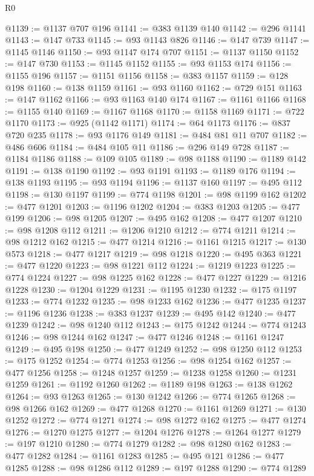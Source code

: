 \begin{lexlean}{R0}
\begin{coremodule}
@1139 := @1137 @707 @196
@1141 := @383 @1139 @140
@1142 := @296 @1141
@1143 := @147 @733
@1145 := @93 @1143 @826
@1146 := @147 @739
@1147 := @1145 @1146
@1150 := @93 @1147 @174 @707
@1151 := @1137 @1150
@1152 := @147 @730
@1153 := @1145 @1152
@1155 := @93 @1153 @174
@1156 := @1155 @196
@1157 := @1151 @1156
@1158 := @383 @1157
@1159 := @128 @198
@1160 := @138 @1159
@1161 := @93 @1160
@1162 := @729 @151
@1163 := @147 @1162
@1166 := @93 @1163 @140 @174
@1167 := @1161 @1166
@1168 := @1155 @140
@1169 := @1167 @1168
@1170 := @1158 @1169
@1171 := @722 @1170
@1173 := @925 (@1142 @1171)
@1174 := @64 @1173
@1176 := @837 @720 @235
@1178 := @93 @1176 @149
@1181 := @484 @81 @11 @707
@1182 := @486 @606
@1184 := @484 @105 @11
@1186 := @296 @149 @728
@1187 := @1184 @1186
@1188 := @109 @105
@1189 := @98 @1188
@1190 := @1189 @142
@1191 := @138 @1190
@1192 := @93 @1191
@1193 := @1189 @176
@1194 := @138 @1193
@1195 := @93 @1194
@1196 := @1137 @160
@1197 := @495 @112
@1198 := @130 @1197
@1199 := @774 @1198
@1201 := @98 @1199 @162
@1202 := @477 @1201
@1203 := @1196 @1202
@1204 := @383 @1203
@1205 := @477 @199
@1206 := @98 @1205
@1207 := @495 @162
@1208 := @477 @1207
@1210 := @98 @1208 @112
@1211 := @1206 @1210
@1212 := @774 @1211
@1214 := @98 @1212 @162
@1215 := @477 @1214
@1216 := @1161 @1215
@1217 := @130 @573
@1218 := @477 @1217
@1219 := @98 @1218
@1220 := @495 @363
@1221 := @477 @1220
@1223 := @98 @1221 @112
@1224 := @1219 @1223
@1225 := @774 @1224
@1227 := @98 @1225 @162
@1228 := @477 @1227
@1229 := @1216 @1228
@1230 := @1204 @1229
@1231 := @1195 @1230
@1232 := @175 @1197
@1233 := @774 @1232
@1235 := @98 @1233 @162
@1236 := @477 @1235
@1237 := @1196 @1236
@1238 := @383 @1237
@1239 := @495 @142
@1240 := @477 @1239
@1242 := @98 @1240 @112
@1243 := @175 @1242
@1244 := @774 @1243
@1246 := @98 @1244 @162
@1247 := @477 @1246
@1248 := @1161 @1247
@1249 := @495 @198
@1250 := @477 @1249
@1252 := @98 @1250 @112
@1253 := @175 @1252
@1254 := @774 @1253
@1256 := @98 @1254 @162
@1257 := @477 @1256
@1258 := @1248 @1257
@1259 := @1238 @1258
@1260 := @1231 @1259
@1261 := @1192 @1260
@1262 := @1189 @198
@1263 := @138 @1262
@1264 := @93 @1263
@1265 := @130 @1242
@1266 := @774 @1265
@1268 := @98 @1266 @162
@1269 := @477 @1268
@1270 := @1161 @1269
@1271 := @130 @1252
@1272 := @774 @1271
@1274 := @98 @1272 @162
@1275 := @477 @1274
@1276 := @1270 @1275
@1277 := @1204 @1276
@1278 := @1264 @1277
@1279 := @197 @1210
@1280 := @774 @1279
@1282 := @98 @1280 @162
@1283 := @477 @1282
@1284 := @1161 @1283
@1285 := @495 @121
@1286 := @477 @1285
@1288 := @98 @1286 @112
@1289 := @197 @1288
@1290 := @774 @1289

\end{coremodule}
\end{lexlean}
